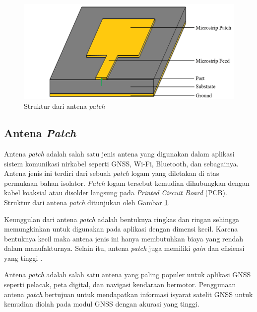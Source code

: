\begin{figure}[ht]
	\centering
	\includegraphics[width=12cm]{contents/chapter-2/patch-antena.jpg}
	\caption{Struktur dari antena \textit{patch} \cite{Chowdhury2019}}
	\label{Fig: patch-antenna}
\end{figure}

\subsection{Antena \textit{Patch}}
Antena \textit{patch} adalah salah satu jenis antena yang digunakan dalam aplikasi sistem komunikasi nirkabel seperti GNSS, Wi-Fi, Bluetooth, dan sebagainya. Antena jenis ini terdiri dari sebuah \textit{patch} logam yang diletakan di atas permukaan bahan isolator. \textit{Patch} logam tersebut kemudian dihubungkan dengan kabel koaksial atau disolder langsung pada \textit{Printed Circuit Board} (PCB). Struktur dari antena \textit{patch} ditunjukan oleh Gambar \ref{Fig: patch-antenna}.

Keunggulan dari antena \textit{patch} adalah bentuknya ringkas dan ringan sehingga memungkinkan untuk digunakan pada aplikasi dengan dimensi kecil. Karena bentuknya kecil maka antena jenis ini hanya membutuhkan biaya yang rendah dalam manufakturnya. Selain itu, antena \textit{patch} juga memiliki \textit{gain} dan efisiensi yang tinggi \cite{Ding2020}.

Antena \textit{patch} adalah salah satu antena yang paling populer untuk aplikasi GNSS seperti pelacak, peta digital, dan navigasi kendaraan bermotor. Penggunaan antena \textit{patch} bertujuan untuk mendapatkan informasi isyarat satelit GNSS untuk kemudian diolah pada modul GNSS dengan akurasi yang tinggi.

